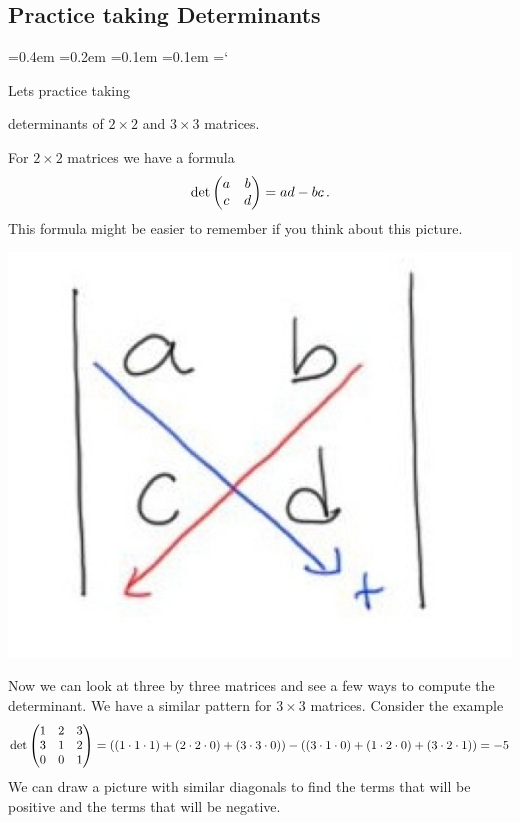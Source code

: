
\subsection*{Practice taking Determinants}

{\ttfamily
{}\font=0.4em
\font=0.2em
\font=0.1em
\font=0.1em
\hyphenchar\font=`\-





\hypertarget{video_properties_of_determinant_practice}{Lets practice taking} determinants of $2 \times 2$ and $3\times 3$ matrices. 

For $2 \times 2$ matrices we have a formula
\[
{\rm det}
\begin{pmatrix}
a & b \\
c & d \\
\end{pmatrix}
= ad - bc\, .
\]
This formula might be easier to remember if you think about this picture.
\begin{center}
\includegraphics[scale=.20]{determinant_2by2.jpg}
\end{center}

Now we can look at three by three matrices and see a few ways to compute the determinant. We have a similar pattern for $3\times 3$ matrices. 
Consider the example 
\[
{\rm det}
\begin{pmatrix}
1 & 2 & 3 \\
3 & 1 & 2 \\
0 & 0 & 1 \\
\end{pmatrix}
= ( (1\cdot 1\cdot 1)+ (2\cdot 2\cdot 0) + (3\cdot 3\cdot 0)) - ((3\cdot 1\cdot 0)+ (1\cdot 2\cdot 0) + (3\cdot 2\cdot 1)) = -5
\]
We can draw a picture with similar diagonals to find the terms that will be positive and the terms that will be negative.

}
